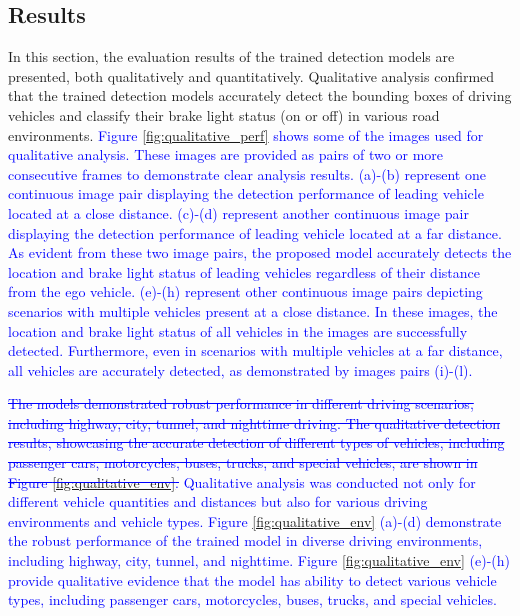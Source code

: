 \subsection{Results}
\label{sec:exp_results}
In this section, the evaluation results of the trained detection models are presented, both qualitatively and quantitatively.
Qualitative analysis confirmed that the trained detection models accurately detect the bounding boxes of driving vehicles and classify their brake light status (on or off) in various road environments.
\textcolor{blue}{
Figure \ref{fig:qualitative_perf} shows some of the images used for qualitative analysis.
These images are provided as pairs of two or more consecutive frames to demonstrate clear analysis results.
(a)-(b) represent one continuous image pair displaying the detection performance of leading vehicle located at a close distance.
(c)-(d) represent another continuous image pair displaying the detection performance of leading vehicle located at a far distance.
As evident from these two image pairs, the proposed model accurately detects the location and brake light status of leading vehicles regardless of their distance from the ego vehicle.
(e)-(h) represent other continuous image pairs depicting scenarios with multiple vehicles present at a close distance.
In these images, the location and brake light status of all vehicles in the images are successfully detected.
Furthermore, even in scenarios with multiple vehicles at a far distance, all vehicles are accurately detected, as demonstrated by images pairs (i)-(l).
}

\textcolor{blue}{
    \sout{The models demonstrated robust performance in different driving scenarios, including highway, city, tunnel, and nighttime driving.
The qualitative detection results, showcasing the accurate detection of different types of vehicles, including passenger cars, motorcycles, buses, trucks, and special vehicles, are shown in Figure \ref{fig:qualitative_env}.}
Qualitative analysis was conducted not only for different vehicle quantities and distances but also for various driving environments and vehicle types.
Figure \ref{fig:qualitative_env} (a)-(d) demonstrate the robust performance of the trained model in diverse driving environments, including highway, city, tunnel, and nighttime.
Figure \ref{fig:qualitative_env} (e)-(h) provide qualitative evidence that the model has ability to detect various vehicle types, including passenger cars, motorcycles, buses, trucks, and special vehicles.
}

